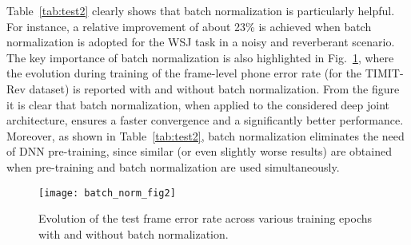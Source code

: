 \documentclass{article}
\begin{document}
Table~\ref{tab:test2} clearly shows that batch normalization is particularly helpful. For instance, a relative improvement of about 23\% is achieved when batch normalization is adopted for the WSJ task in a noisy and reverberant scenario. The key importance of batch normalization is also highlighted in Fig.~\ref{fig:bn_frame}, where the evolution during training of the frame-level phone error rate (for the TIMIT-Rev dataset) is reported with and without batch normalization. From the figure it is clear that batch normalization, when applied to the considered deep joint architecture, ensures a faster convergence and a significantly better performance. Moreover, as shown in Table~\ref{tab:test2}, batch normalization eliminates the need of DNN pre-training, since similar (or even slightly worse results) are obtained when pre-training and batch normalization are used simultaneously.
\begin{figure}
\centering
\texttt{[image: batch\_norm\_fig2]}
\caption{Evolution of the test frame error rate across various training epochs with and without batch normalization.}
\label{fig:bn_frame}
\end{figure}

\end{document}
